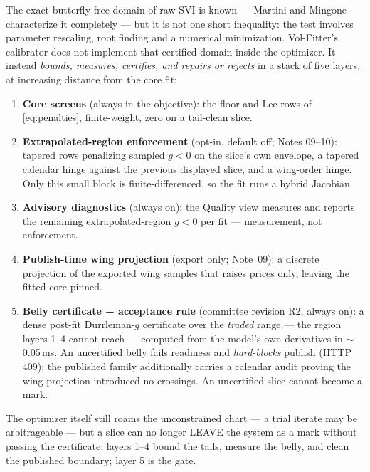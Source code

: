 \documentclass[11pt]{article}
\begin{document}
The exact butterfly-free domain of raw SVI is known --- Martini and Mingone
\cite{MartiniMingone2022} characterize it completely --- but it is not one short
inequality: the test involves parameter rescaling, root finding and a numerical
minimization.  Vol-Fitter's calibrator does not implement that certified domain
inside the optimizer.  It instead \emph{bounds, measures, certifies, and
repairs or rejects} in a stack of five layers, at increasing distance from
the core fit:
\begin{enumerate}[leftmargin=1.6em]
\item \textbf{Core screens} (always in the objective): the floor and Lee rows of
\cref{eq:penalties}, finite-weight, zero on a tail-clean slice.
\item \textbf{Extrapolated-region enforcement} (opt-in, default off; Notes
09--10): tapered rows penalizing sampled $g<0$ on the slice's own envelope, a
tapered calendar hinge against the previous displayed slice, and a wing-order
hinge.  Only this small block is finite-differenced, so the fit runs a hybrid
Jacobian.
\item \textbf{Advisory diagnostics} (always on): the Quality view measures and
reports the remaining extrapolated-region $g<0$ per fit --- measurement, not
enforcement.
\item \textbf{Publish-time wing projection} (export only; Note~09): a discrete
projection of the exported wing samples that raises prices only, leaving the
fitted core pinned.
\item \textbf{Belly certificate + acceptance rule} (committee revision R2,
always on): a dense post-fit Durrleman-$g$ certificate over the \emph{traded}
range --- the region layers 1--4 cannot reach --- computed from the model's
own derivatives in $\sim$0.05\,ms.  An uncertified belly fails readiness and
\emph{hard-blocks} publish (HTTP 409); the published family additionally
carries a calendar audit proving the wing projection introduced no
crossings.  An uncertified slice cannot become a mark.
\end{enumerate}
The optimizer itself still roams the unconstrained chart --- a trial iterate
may be arbitrageable --- but a slice can no longer LEAVE the system as a mark
without passing the certificate: layers 1--4 bound the tails, measure the
belly, and clean the published boundary; layer 5 is the gate.
\end{document}
